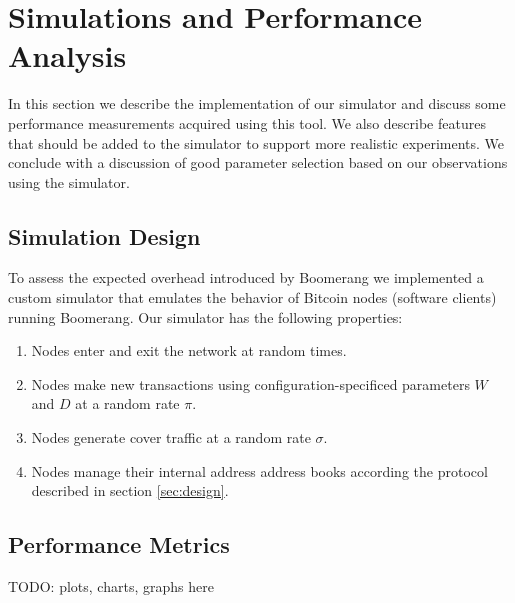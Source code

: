 \section{Simulations and Performance Analysis}
In this section we describe the implementation of our simulator and discuss some performance measurements acquired using this tool. We also describe features that should be added to the simulator to support more realistic experiments. We conclude with a discussion of good parameter selection based on our observations using the simulator.

\subsection{Simulation Design}
To assess the expected overhead introduced by Boomerang we implemented a custom simulator that emulates the behavior of Bitcoin nodes (software clients) running Boomerang. Our simulator has the following properties:
\begin{enumerate}
	\item Nodes enter and exit the network at random times. 
	\item Nodes make new transactions using configuration-specificed parameters $W$ and $D$ at a random rate $\pi$.
	\item Nodes generate cover traffic at a random rate $\sigma$.
	\item Nodes manage their internal address address books according the protocol described in section \ref{sec:design}.
\end{enumerate}


\subsection{Performance Metrics}
TODO: plots, charts, graphs here

